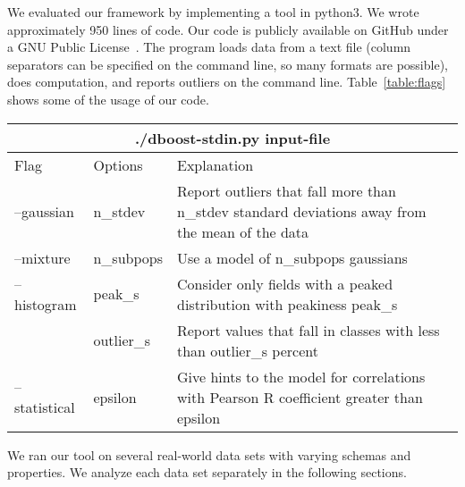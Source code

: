 
We evaluated our framework by implementing a tool in python3.
We wrote approximately 950 lines of code.
Our code is publicly available on GitHub under a GNU Public License~\cite{github}.
The program loads data from a text file (column separators can be specified on the command line, so many formats are possible), does computation, and reports outliers on the command line.
Table~\ref{table:flags} shows some of the usage of our code.

\begin{table*}
\label{table:flags}
\caption{Tool usage.}
\centering
\begin{tabular} {| l | l | p{10cm} |}
\hline
\multicolumn{3}{|c|}{./dboost-stdin.py input-file} \\
\hline
Flag & Options & Explanation \\
\hline
--gaussian & n\_stdev & Report outliers that fall more than n\_stdev standard deviations away from the mean of the data \\
--mixture & n\_subpops & Use a model of n\_subpops gaussians \\
--histogram & peak\_s & Consider only fields with a peaked distribution with peakiness peak\_s \\
  & outlier\_s & Report values that fall in classes with less than outlier\_s percent \\
--statistical & epsilon & Give hints to the model for correlations with Pearson R coefficient greater than epsilon \\
\hline
\end{tabular}
\end{table*}

We ran our tool on several real-world data sets with varying schemas and properties.
We analyze each data set separately in the following sections.
